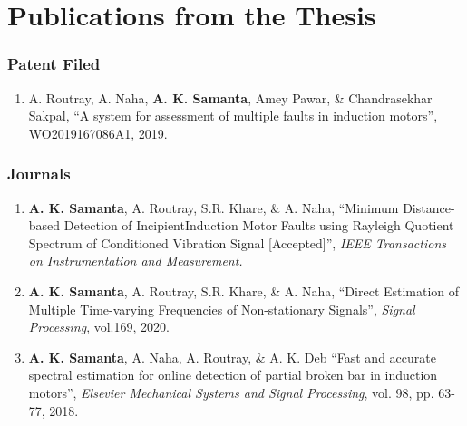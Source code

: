 \chapter*{Publications from the Thesis}

\subsection*{Patent Filed}
\begin{enumerate}
	\item{A. Routray, A. Naha, \textbf{A. K. Samanta}, Amey Pawar, \& Chandrasekhar Sakpal, “A system for assessment of multiple faults in induction motors”, WO2019167086A1, 2019.}
\end{enumerate}

\subsection*{Journals}
\begin{enumerate}
	\item{\textbf{A. K. Samanta}, A. Routray, S.R. Khare, \& A. Naha, “Minimum Distance-based Detection of IncipientInduction Motor Faults using Rayleigh Quotient Spectrum of Conditioned Vibration Signal [Accepted]”, \textit{IEEE Transactions on Instrumentation and Measurement.}}
	\item{\textbf{A. K. Samanta}, A. Routray, S.R. Khare, \& A. Naha, “Direct Estimation of Multiple Time-varying Frequencies of Non-stationary Signals”, \textit{Signal Processing}, vol.169, 2020.}
	\item{\textbf{A. K. Samanta}, A. Naha, A. Routray, \& A. K. Deb “Fast and accurate spectral estimation for online detection of partial broken bar in induction motors”, \textit{Elsevier Mechanical Systems and Signal Processing}, vol. 98, pp. 63-77, 2018.}
\end{enumerate}